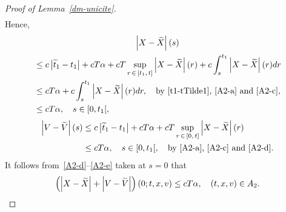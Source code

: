 \documentclass[10pt]{amsart}
\theoremstyle{definition}\newtheorem{defi}[theo]{Definition}\newtheorem{rema}[theo]{Remark}\newtheorem{exam}[theo]{Example}\newtheorem{exem}[theo]{Example}\newtheorem{nota}[theo]{Notation}
\let\oldtilde\tilde
\renewcommand*{\tilde}[1]{\mathchoice{\widetilde{#1}}{\widetilde{#1}}{\oldtilde{#1}}{\oldtilde{#1}}}
\begin{document}
\begin{proof}[{Proof of Lemma~\ref{dm-unicite}}]
\begin{align*}
\end{align*}
Hence,
\begin{multline}\label{A2-d}
\left|X-\tilde{X}\right|(s) \\
\begin{aligned}
&\leq c\left|\tilde{t}_1-t_1\right|+cT\alpha +cT\sup_{r\,\in\, \left[t_1,\,t\right]} \left|X-\tilde{X}\right|(r) + c\int_s^{t_1} \left|X-\tilde{X}\right|(r) dr \\
&\leq cT\alpha + c\int_s^{t_1} \left|X-\tilde{X}\right|(r) dr, \quad \text{by~\eqref{t1-tTilde1},~\eqref{A2-a} and~\eqref{A2-c}}, \\
&\leq cT\alpha, \quad s \in [0,t_1[, 
\end{aligned}
\end{multline}
\begin{equation}\label{A2-e}
\begin{split}
\left|V-\tilde{V}\right|(s) &\leq c\left|\tilde{t}_1-t_1\right|+cT\alpha +cT\sup_{r\,\in\,[0,\,t]} \left|X-\tilde{X}\right|(r) \\
&\leq cT\alpha, \quad s \in [0,t_1[, \quad \text{by~\eqref{A2-a}, \eqref{A2-c} and~\eqref{A2-d}}. 
\end{split}
\end{equation}
It follows from~\eqref{A2-d}--\eqref{A2-e} taken at $s=0$ that
\begin{equation}\label{A2-f}
\left (\left|X-\tilde{X}\right|+\left|V-\tilde{V}\right| \right) (0;t,x,v) \leq cT\alpha, \quad (t,x,v) \in A_2.
\end{equation}


\end{proof}
\end{document}

